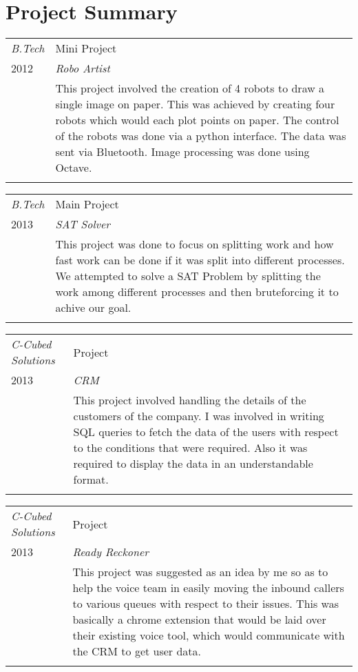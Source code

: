 \documentclass[a4paper]{article}
\begin{document}
\section{Project Summary}

\begin{tabular}{p{4cm}|p{13cm}}
\emph{B.Tech} & Mini Project \\
\textsc{2012} & \emph{Robo Artist} \\
& \normalsize{This project involved the creation of 4 robots to draw a single image on paper. This was achieved by creating four robots which would each plot points on paper. The control of the robots was done via a python interface. The data was sent via Bluetooth. Image processing was done using Octave. 
}
\\
\multicolumn{2}{c}{}
\end{tabular}

\begin{tabular}{p{4cm}|p{13cm}}
\emph{B.Tech} & Main Project \\
\textsc{2013} & \emph{SAT Solver} \\
& \normalsize{This project was done to focus on splitting work and how fast work can be done if it was split into different processes. We attempted to solve a SAT Problem by splitting the work among different processes and then bruteforcing it to achive our goal. 
}
\\
\multicolumn{2}{c}{}
\end{tabular}

\begin{tabular}{p{4cm}|p{13cm}}
\emph{C-Cubed Solutions} & Project \\
\textsc{2013} & \emph{CRM} \\
& \normalsize{This project involved handling the details of the customers of the company. I was involved in writing SQL queries to fetch the data of the users with respect to the conditions that were required. Also it was required to display the data in an understandable format.
}
\\
\multicolumn{2}{c}{}
\end{tabular}

\begin{tabular}{p{4cm}|p{13cm}}
\emph{C-Cubed Solutions} & Project \\
\textsc{2013} & \emph{Ready Reckoner} \\
& \normalsize{This project was suggested as an idea by me so as to help the voice team in easily moving the inbound callers to various queues with respect to their issues. This was basically a chrome extension that would be laid over their existing voice tool, which would communicate with the CRM to get user data.
}
\\
\multicolumn{2}{c}{}
\end{tabular}
\end{document}
